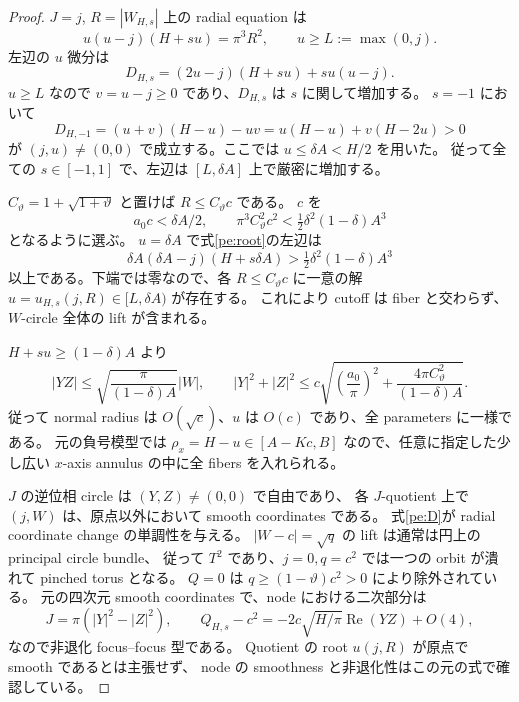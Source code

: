 \begin{proof}
$J=j$, $R=|W_{H,s}|$ 上の radial equation は
\begin{equation}\label{pe:root}
 u(u-j)(H+s u)=\pi^3R^2,\qquad u\ge L:=\max(0,j).
\end{equation}
左辺の $u$ 微分は
\begin{equation}\label{pe:D}
 D_{H,s}=(2u-j)(H+s u)+s u(u-j).
\end{equation}
$u\ge L$ なので $v=u-j\ge0$ であり、$D_{H,s}$ は $s$ に関して増加する。
$s=-1$ において
\[
 D_{H,-1}=(u+v)(H-u)-uv
         =u(H-u)+v(H-2u)>0
\]
が $(j,u)\ne(0,0)$ で成立する。ここでは $u\le\delta A<H/2$ を用いた。
従って全ての $s\in[-1,1]$ で、左辺は $[L,\delta A]$ 上で厳密に増加する。

$C_\vartheta=1+\sqrt{1+\vartheta}$ と置けば $R\le C_\vartheta c$ である。
$c$ を
\begin{equation}\label{pe:smallness}
 a_0c<\delta A/2,\qquad
 \pi^3 C_\vartheta^2c^2<\tfrac12\delta^2(1-\delta)A^3
\end{equation}
となるように選ぶ。
$u=\delta A$ で式\eqref{pe:root}の左辺は
\[
 \delta A(\delta A-j)(H+s\delta A)
 >\tfrac12\delta^2(1-\delta)A^3
\]
以上である。下端では零なので、各 $R\le C_\vartheta c$ に一意の解
$u=u_{H,s}(j,R)\in[L,\delta A)$ が存在する。
これにより cutoff は fiber と交わらず、$W$-circle 全体の lift が含まれる。

$H+s u\ge(1-\delta)A$ より
\[
 |YZ|\le\sqrt{\frac\pi{(1-\delta)A}}|W|,\qquad
 |Y|^2+|Z|^2
 \le c\sqrt{\left(\frac{a_0}\pi\right)^2+
                \frac{4\pi C_\vartheta^2}{(1-\delta)A}}.
\]
従って normal radius は $O(\sqrt c)$、$u$ は $O(c)$ であり、全 parameters に一様である。
元の負号模型では $\rho_x=H-u\in[A-Kc,B]$ なので、任意に指定した少し広い
$x$-axis annulus の中に全 fibers を入れられる。

$J$ の逆位相 circle は $(Y,Z)\ne(0,0)$ で自由であり、
各 $J$-quotient 上で $(j,W)$ は、原点以外において smooth coordinates である。
式\eqref{pe:D}が radial coordinate change の単調性を与える。
$|W-c|=\sqrt q$ の lift は通常は円上の principal circle bundle、
従って $T^2$ であり、$j=0,q=c^2$ では一つの orbit が潰れて pinched torus となる。
$Q=0$ は $q\ge(1-\vartheta)c^2>0$ により除外されている。
元の四次元 smooth coordinates で、node における二次部分は
\[
 J=\pi(|Y|^2-|Z|^2),\qquad
 Q_{H,s}-c^2=-2c\sqrt{H/\pi}\operatorname{Re}(YZ)+O(4),
\]
なので非退化 focus--focus 型である。
Quotient の root $u(j,R)$ が原点で smooth であるとは主張せず、
node の smoothness と非退化性はこの元の式で確認している。
\end{proof}

